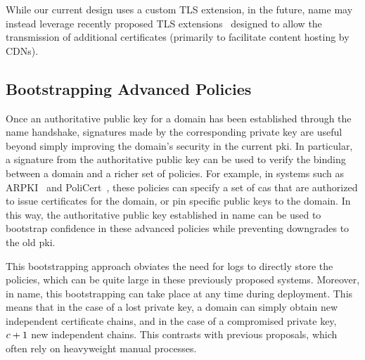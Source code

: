 While our current design uses a custom TLS extension, in the future, \ac{name}
may instead leverage recently proposed TLS
extensions~\cite{rfc-extra-cert-1, rfc-extra-cert-2} designed to allow the
transmission of additional certificates (primarily to facilitate content hosting
by CDNs).  

\subsection{Bootstrapping Advanced Policies}
\label{sec:design:bootstrapping}

Once an authoritative public key for a domain has been established through the
\ac{name} handshake, signatures made by the corresponding private key are useful
beyond simply improving the domain's security in the current \ac{pki}. In
particular, a signature from the authoritative public key can be used to verify
the binding between a domain and a richer set of policies. For example, in
systems such as ARPKI~\cite{basin2014arpki} and
PoliCert~\cite{szalachowski2014policert}, these policies can specify a set of
\acp{ca} that are authorized to issue certificates for the domain, or pin
specific public keys to the domain. In this way, the authoritative public key
established in \ac{name} can be used to bootstrap confidence in these advanced
policies while preventing downgrades to the old \ac{pki}.

This bootstrapping approach obviates the need for logs to directly store the
policies, which can be quite large in these previously proposed systems.
Moreover, in \ac{name}, this bootstrapping can take place at any time during
deployment. This means that in the case of a lost private key, a domain can
simply obtain \policy new independent certificate chains, and in the case of a
compromised private key, $c + 1$ new independent chains. This contrasts
with previous proposals, which often rely on heavyweight manual processes.

